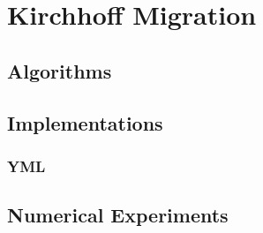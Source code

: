 \chapter{Kirchhoff Migration}

\section{Algorithms}

\section{Implementations}
\subsection{YML}

\section{Numerical Experiments}